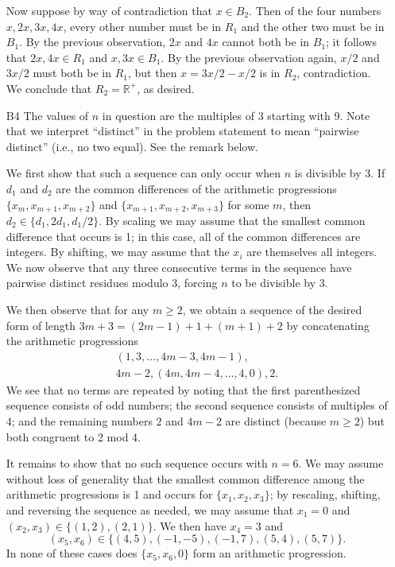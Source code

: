 \documentclass[amssymb,twocolumn,pra,10pt,aps]{revtex4-1}
\begin{document}
\begin{itemize}
Now suppose by way of contradiction that $x \in B_2$. Then of the four numbers $x,2x,3x,4x$, every other number must be in $R_1$ and the other two must be in $B_1$. By the previous observation, $2x$ and $4x$ cannot both be in $B_1$; it follows that $2x,4x \in R_1$ and $x,3x \in B_1$. By the previous observation again, $x/2$ and $3x/2$ must both be in $R_1$, but then $x = 3x/2-x/2$ is in $R_2$, contradiction. We conclude that $R_2 = \mathbb{R}^+$, as desired.

\item[B4]
The values of $n$ in question are the multiples of 3 starting with 9. Note that we interpret ``distinct'' in the problem statement to mean ``pairwise distinct'' (i.e., no two equal). See the remark below.

We first show that such a sequence can only occur when $n$ is divisible by 3.
If $d_1$ and $d_2$ are the common differences of the arithmetic progressions $\{x_m, x_{m+1}, x_{m+2}\}$ and $\{x_{m+1}, x_{m+2}, x_{m+3}\}$ for some $m$, then $d_2 \in \{d_1, 2d_1, d_1/2\}$. 
By scaling we may assume that the smallest common difference that occurs is 1; in this case, all of the common differences are integers. By shifting, we may assume that the $x_i$ are themselves all integers. We now observe that any three consecutive terms in the sequence have pairwise distinct residues modulo 3, 
forcing $n$ to be divisible by 3.

We then observe that for any $m \geq 2$, 
we obtain a sequence of the desired form of length $3m+3 = (2m-1)+1+(m+1)+2$ by
concatenating the arithmetic progressions
\begin{gather*}
(1, 3, \dots, 4m-3, 4m-1), \\
4m-2, (4m, 4m-4, \dots, 4, 0), 2.
\end{gather*}
We see that no terms are repeated by noting that the first parenthesized sequence consists of odd numbers; the second sequence consists of multiples of 4; and the remaining numbers $2$ and $4m-2$ are distinct (because $m \geq 2$) but both congruent to 2 mod 4.

It remains to show that no such sequence occurs with $n=6$.
We may assume without loss of generality that the smallest common difference among the arithmetic progressions is 1 and occurs for $\{x_1, x_2, x_3\}$; by rescaling, shifting, and reversing the sequence as needed, we may assume that
$x_1 = 0$ and $(x_2, x_3) \in \{(1,2), (2,1)\}$.
We then have $x_4 = 3$ and
\[
(x_5, x_6) \in \{(4,5), (-1, -5), (-1, 7), (5, 4), (5, 7)\}.
\]
In none of these cases does $\{x_5, x_6, 0\}$ form an arithmetic progression.


\end{itemize}
\end{document}
